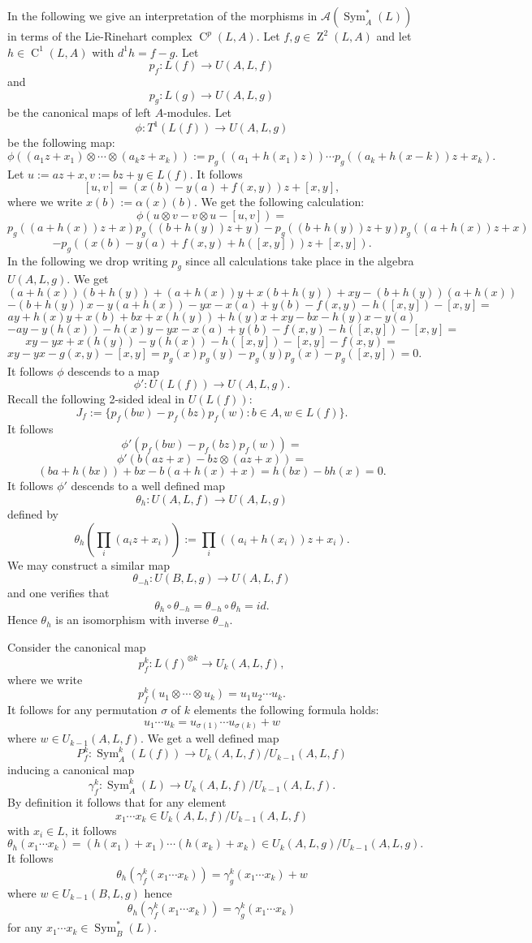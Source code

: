 \documentclass{amsart}
\theoremstyle{plain}
\theoremstyle{definition}
\theoremstyle{remark}
\numberwithin{equation}{theorem}
\begin{document}
In the following we give an interpretation of the morphisms in ${\mathcal{A}} ({\operatorname{Sym} }_{A}^*(L))$ in terms of the Lie-Rinehart complex
${\operatorname{C} }^p(L,{A})$. Let $f,g\in {\operatorname{Z}}^2(L,{A})$ and let $h\in {\operatorname{C} }^1(L,{A})$ with $d^1h=f-g$.
Let
\[ p_f:L(f)\rightarrow U({A},L,f)\]
and
\[ p_g:L(g)\rightarrow U({A},L,g) \]
be the canonical maps of left ${A}$-modules.
Let
\[ \phi:T^1(L(f))\rightarrow U({A},L,g) \]
be the following map:
\[ \phi((a_1z+x_1)\otimes \cdots \otimes (a_kz+x_k)):=p_g((a_1+h(x_1)z))\cdots p_g((a_k+h(x-k))z+x_k).\]
Let $u:=az+x, v:=bz+y \in L(f)$. It follows
\[ [u,v]=(x(b)-y(a)+f(x,y))z+[x,y],\]
where we write $x(b):=\alpha(x)(b)$.
We get the following calculation:
\[ \phi(u\otimes v-v\otimes u -[u,v])=\]
\[p_g((a+h(x))z+x)p_g((b+h(y))z+y)-p_g((b+h(y))z+y)p_g((a+h(x))z+x) \]
\[ -p_g((x(b)-y(a)+f(x,y)+h([x,y]))z+[x,y]).\]
In the following we drop writing $p_g$ since all calculations take place in the algebra $U({A},L,g)$.
We get
\[ (a+h(x))(b+h(y))+(a+h(x))y+x(b+h(y))+xy-(b+h(y))(a+h(x))\]
\[ -(b+h(y))x-y(a+h(x))-yx -x(a)+y(b)-f(x,y)-h([x,y])-[x,y]=\]
\[ ay+h(x)y+x(b)+bx+x(h(y))+h(y)x+xy-bx-h(y)x-y(a)\]
\[ -ay-y(h(x))-h(x)y-yx -x(a)+y(b)-f(x,y)-h([x,y])-[x,y]=\]
\[ xy-yx+x(h(y))-y(h(x))-h([x,y])-[x,y]-f(x,y)=\]
\[xy-yx-g(x,y)-[x,y]=p_g(x)p_g(y)-p_g(y)p_g(x)-p_g([x,y])=0.\]
It follows $\phi$ descends to a map
\[ \phi':U(L(f))\rightarrow U({A},L,g).\]
Recall the following 2-sided ideal in $U(L(f))$: 
\[J_f:=\{p_f(bw)-p_f(bz)p_f(w):b\in {A}, w\in L(f)\}.\]
It follows
\[ \phi'(p_f(bw)-p_f(bz)p_f(w))=\]
\[\phi'(b(az+x)-bz\otimes (az+x))=\]
\[(ba+h(bx))+bx-b(a+h(x)+x)=h(bx)-bh(x)=0.\]
It follows $\phi'$ descends to a well defined map
\[ \theta_h:U({A},L,f)\rightarrow U({A},L,g) \]
defined by
\[ \theta_h(\prod_i (a_iz+x_i)):=\prod_i ((a_i+h(x_i))z+x_i).\]
We may construct a similar map
\[ \theta_{-h}:U(B,L,g)\rightarrow U({A},L,f)\]
and one verifies that
\[ \theta_h\circ \theta_{-h}=\theta_{-h}\circ \theta_h=id.\]
Hence $\theta_h$ is an isomorphism with inverse $\theta_{-h}$.

Consider the canonical map
\[ p_f^k:L(f)^{\otimes k}\rightarrow U_k({A},L,f), \]
where we write
\[ p_f^k(u_1\otimes \cdots \otimes u_k)=u_1u_2\cdots u_k.\]
It follows for any permutation $\sigma$ of $k$ elements the following formula holds:
\[ u_1\cdots u_k=u_{\sigma(1)}\cdots u_{\sigma(k)}+w\]
where $w\in U_{k-1}({A},L,f)$. We get a well defined map
\[ P^k_f:{\operatorname{Sym} }_{A}^k(L(f))\rightarrow U_k({A},L,f)/U_{k-1}({A},L,f) \]
inducing a canonical map
\[ \gamma_f^k:{\operatorname{Sym} }_{A}^k(L)\rightarrow U_k({A},L,f)/U_{k-1}({A},L,f).\]
By definition it follows that for any element
\[ x_1\cdots x_k \in U_k({A},L,f)/U_{k-1}({A},L,f)\]
with $x_i \in L$, it follows
\[ \theta_h(x_1\cdots x_k)=(h(x_1)+x_1)\cdots (h(x_k)+x_k)\in U_k({A},L,g)/U_{k-1}({A},L,g).\]
It follows
\[ \theta_h(\gamma^k_f(x_1\cdots x_k))=\gamma^k_g(x_1\cdots x_k)+w\]
where $w\in U_{k-1}(B,L,g)$ hence
\[ \theta_h(\gamma^k_f(x_1\cdots x_k))=\gamma^k_g(x_1\cdots x_k) \]
for any $x_1\cdots x_k\in {\operatorname{Sym} }_B^*(L)$. 
\end{document}
